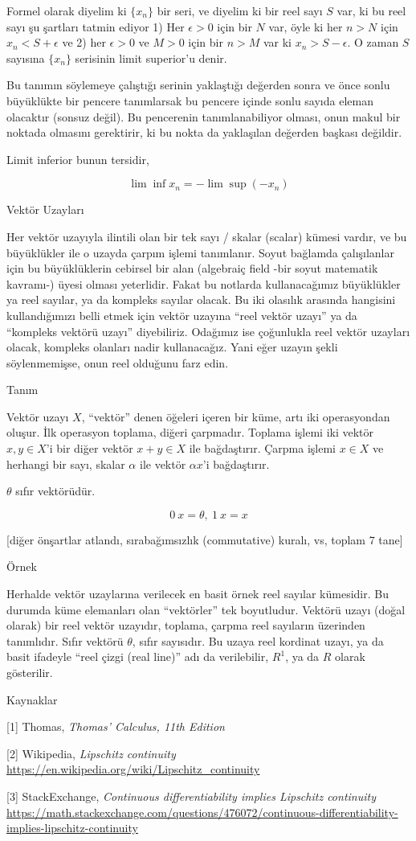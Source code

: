 \documentclass[12pt,fleqn]{article}\usepackage{../../common}
\begin{document}
Formel olarak diyelim ki $\{x_n\}$ bir seri, ve diyelim ki bir reel sayı $S$
var, ki bu reel sayı şu şartları tatmin ediyor 1) Her $\epsilon > 0$ için bir
$N$ var, öyle ki her $n>N$ için $x_n < S + \epsilon$ ve 2) her $\epsilon > 0$ ve
$M>0$ için bir $n>M$ var ki $x_n > S - \epsilon$. O zaman $S$ sayısına $\{x_n\}$
serisinin limit superior'u denir.

Bu tanımın söylemeye çalıştığı serinin yaklaştığı değerden sonra ve önce sonlu
büyüklükte bir pencere tanımlarsak bu pencere içinde sonlu sayıda eleman
olacaktır (sonsuz değil). Bu pencerenin tanımlanabiliyor olması, onun makul bir
noktada olmasını gerektirir, ki bu nokta da yaklaşılan değerden başkası
değildir.

Limit inferior bunun tersidir, 

$$ \lim \inf x_n  = -\lim \sup(-x_n)$$

Vektör Uzayları 

Her vektör uzayıyla ilintili olan bir tek sayı / skalar (scalar) kümesi vardır,
ve bu büyüklükler ile o uzayda çarpım işlemi tanımlanır. Soyut bağlamda
çalışılanlar için bu büyüklüklerin cebirsel bir alan (algebraiç field -bir soyut
matematik kavramı-) üyesi olması yeterlidir. Fakat bu notlarda kullanacağımız
büyüklükler ya reel sayılar, ya da kompleks sayılar olacak. Bu iki olasılık
arasında hangisini kullandığımızı belli etmek için vektör uzayına ``reel vektör
uzayı'' ya da ``kompleks vektörü uzayı'' diyebiliriz. Odağımız ise çoğunlukla
reel vektör uzayları olacak, kompleks olanları nadir kullanacağız. Yani eğer
uzayın şekli söylenmemişse, onun reel olduğunu farz edin.

Tanım 

Vektör uzayı $X$, ``vektör'' denen öğeleri içeren bir küme, artı iki
operasyondan oluşur. İlk operasyon toplama, diğeri çarpmadır. Toplama işlemi iki
vektör $x,y \in X$'i bir diğer vektör $x+y \in X$ ile bağdaştırır. Çarpma işlemi
$x \in X$ ve herhangi bir sayı, skalar $\alpha$ ile vektör $\alpha x$'i
bağdaştırır.

$\theta$ sıfır vektörüdür. 

$$  0 \ x = \theta, \ 1 \ x = x $$

[diğer önşartlar atlandı, sırabağımsızlık (commutative) kuralı, vs, toplam 7
  tane]

Örnek

Herhalde vektör uzaylarına verilecek en basit örnek reel sayılar kümesidir. Bu
durumda küme elemanları olan ``vektörler'' tek boyutludur. Vektörü uzayı (doğal
olarak) bir reel vektör uzayıdır, toplama, çarpma reel sayıların üzerinden
tanımlıdır. Sıfır vektörü $\theta$, sıfır sayısıdır. Bu uzaya reel kordinat
uzayı, ya da basit ifadeyle ``reel çizgi (real line)'' adı da verilebilir,
$R^1$, ya da $R$ olarak gösterilir.

Kaynaklar

[1] Thomas, {\em Thomas' Calculus, 11th Edition} 

[2] Wikipedia, {\em Lipschitz continuity}
    \url{https://en.wikipedia.org/wiki/Lipschitz_continuity}

[3] StackExchange, {\em Continuous differentiability implies Lipschitz continuity}
    \url{https://math.stackexchange.com/questions/476072/continuous-differentiability-implies-lipschitz-continuity}
    
\end{document}
